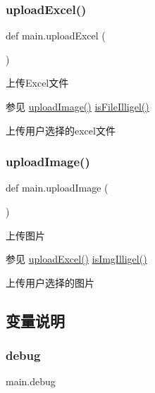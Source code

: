 \mbox{\label{namespacemain_a7f709147939b2c6005d8efdddff85f7b}} 
\subsubsection{\texorpdfstring{uploadExcel()}{uploadExcel()}}
{\footnotesize\ttfamily def main.\+upload\+Excel (\begin{DoxyParamCaption}{ }\end{DoxyParamCaption})}



上传\+Excel文件 

\begin{DoxySeeAlso}{参见}
\mbox{\hyperlink{namespacemain_a3b88a9c9308bfa2308ae6cf744a63e4c}{upload\+Image()}} \mbox{\hyperlink{namespacemain_ab4bfdca65955984f28c72a5d0daec565}{is\+File\+Illigel()}}
\end{DoxySeeAlso}
上传用户选择的excel文件 \mbox{\label{namespacemain_a3b88a9c9308bfa2308ae6cf744a63e4c}} 
\subsubsection{\texorpdfstring{uploadImage()}{uploadImage()}}
{\footnotesize\ttfamily def main.\+upload\+Image (\begin{DoxyParamCaption}{ }\end{DoxyParamCaption})}



上传图片 

\begin{DoxySeeAlso}{参见}
\mbox{\hyperlink{namespacemain_a7f709147939b2c6005d8efdddff85f7b}{upload\+Excel()}} \mbox{\hyperlink{namespacemain_a0deb3fcf5caed9b545bb317bc0f2486f}{is\+Img\+Illigel()}}
\end{DoxySeeAlso}
上传用户选择的图片 

\subsection{变量说明}
\mbox{\label{namespacemain_a800974c07a8e7de9888fff8cd98a827e}} 
\subsubsection{\texorpdfstring{debug}{debug}}
{\footnotesize\ttfamily main.\+debug}

